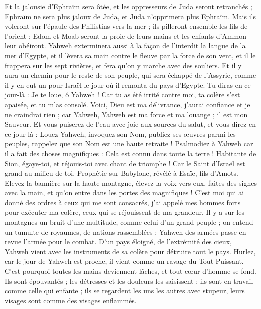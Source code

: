 \begin{multicols}{2}
Et la jalousie d'Ephraïm sera ôtée, et les oppresseurs de Juda seront retranchés ; Ephraïm ne sera plus jaloux de Juda, et Juda n'opprimera plus Ephraïm.
Mais ils voleront sur l'épaule des Philistins vers la mer ; ils pilleront ensemble les fils de l'orient ; Edom et Moab seront la proie de leurs mains et les enfants d'Ammon leur obéiront.
Yahweh exterminera aussi à la façon de l'interdit la langue de la mer d'Egypte, et il lèvera sa main contre le fleuve par la force de son vent, et il le frappera sur les sept rivières, et fera qu'on y marche avec des souliers.
Et il y aura un chemin pour le reste de son peuple, qui sera échappé de l'Assyrie, comme il y en eut un pour Israël le jour où il remonta du pays d'Egypte.
\VerseOne{}Tu diras en ce jour-là : Je te loue, ô Yahweh ! Car tu as été irrité contre moi, ta colère s'est apaisée, et tu m'as consolé.
Voici, Dieu est ma délivrance, j'aurai confiance et je ne craindrai rien ; car Yahweh, Yahweh est ma force et ma louange ; il est mon Sauveur.
Et vous puiserez de l'eau avec joie aux sources du salut,
et vous direz en ce jour-là : Louez Yahweh, invoquez son Nom, publiez ses œuvres parmi les peuples, rappelez que son Nom est une haute retraite !
Psalmodiez à Yahweh car il a fait des choses magnifiques : Cela est connu dans toute la terre !
Habitante de Sion, égaye-toi, et réjouis-toi avec chant de triomphe ! Car le Saint d'Israël est grand au milieu de toi.
\VerseOne{}Prophétie sur Babylone, révélé à Esaïe, fils d'Amots.
Elevez la bannière sur la haute montagne, élevez la voix vers eux, faites des signes avec la main, et qu'on entre dans les portes des magnifiques !
C'est moi qui ai donné des ordres à ceux qui me sont consacrés, j'ai appelé mes hommes forts pour exécuter ma colère, ceux qui se réjouissent de ma grandeur.
Il y a sur les montagnes un bruit d'une multitude, comme celui d'un grand peuple ; on entend un tumulte de royaumes, de nations rassemblées : Yahweh des armées passe en revue l'armée pour le combat.
D'un pays éloigné, de l'extrémité des cieux, Yahweh vient avec les instruments de sa colère pour détruire tout le pays.
Hurlez, car le jour de Yahweh est proche, il vient comme un ravage du Tout-Puissant.
C'est pourquoi toutes les mains deviennent lâches, et tout cœur d'homme se fond.
Ils sont épouvantés ; les détresses et les douleurs les saisissent ; ils sont en travail comme celle qui enfante ; ils se regardent les uns les autres avec stupeur, leurs visages sont comme des visages enflammés.

\end{multicols}
